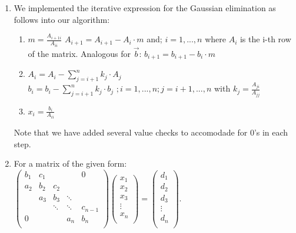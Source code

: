 \documentclass[12pt,a4paper]{article}
\begin{document}
\begin{enumerate}
\item We implemented the iterative expression for the Gaussian elimination as follows into our algorithm:
		\begin{enumerate}[label=\roman*.]
			\item		$m=\frac{A_{i+1 i}}{A_{ii}}$
					\newline
						$A_{i+1}=A_{i+1}-A_{i}\cdot m$	and; $i=1,...,n$					
					\newline	where $A_{i}$ is the i-th row of the matrix. Analogous for $\vec{b}$: 	
					\newline	
						$b_{i+1}=b_{i+1}-b_{i}\cdot m$					
			\item 	$A_{i}=A_{i}-\sum \limits_{j=i+1}^{n}k_{j}\cdot A_{j}$\\				
					$b_{i}=b_{i}-\sum \limits_{j=i+1}^{n} k_{j}\cdot b_{j}$		 $;i=1,...,n ;j=i+1,...,n$	
					\newline
					with  $k_{j}=\frac{A_{j i}}{A_{jj}}$			
			\item 	$x_{i}=\frac{b_{i}}	{A_{ii}}$
		\end{enumerate}
	Note that we have added several value checks to accomodade for 0's in each step.
\item For a matrix of the given form:
\newline
		${\displaystyle \left({\begin{matrix}{b_{1}}&{c_{1}}&{}&{}&{0}\\{a_{2}}&{b_{2}}&{c_{2}}&{}&{}\\{}&{a_{3}}&{b_{3}}&\ddots &{}\\{}&{}&\ddots &\ddots &{c_{n-1}}\\{0}&{}&{}&{a_{n}}&{b_{n}}\\\end{matrix}}\right)\left({\begin{matrix}{x_{1}}\\{x_{2}}\\{x_{3}}\\\vdots \\{x_{n}}\\\end{matrix}}\right)=\left({\begin{matrix}{d_{1}}\\{d_{2}}\\{d_{3}}\\\vdots \\{d_{n}}\\\end{matrix}}\right).}$

\end{enumerate}
\end{document}
